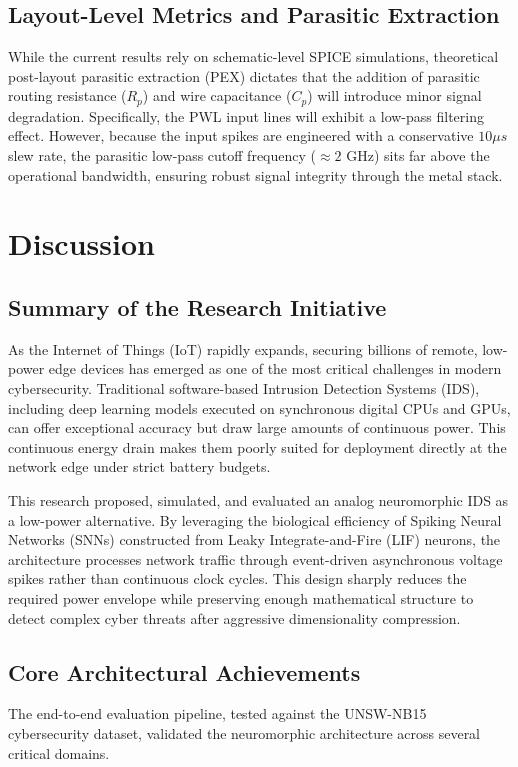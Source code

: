 \documentclass{ieeeaccess}
\begin{document}
\subsection{Layout-Level Metrics and Parasitic Extraction}
While the current results rely on schematic-level SPICE simulations, theoretical post-layout parasitic extraction (PEX) dictates that the addition of parasitic routing resistance ($R_p$) and wire capacitance ($C_p$) will introduce minor signal degradation. Specifically, the PWL input lines will exhibit a low-pass filtering effect. However, because the input spikes are engineered with a conservative $10 \mu s$ slew rate, the parasitic low-pass cutoff frequency ($\approx 2$ GHz) sits far above the operational bandwidth, ensuring robust signal integrity through the metal stack.

\section{Discussion}

\subsection{Summary of the Research Initiative}
As the Internet of Things (IoT) rapidly expands, securing billions of remote, low-power edge devices has emerged as one of the most critical challenges in modern cybersecurity. Traditional software-based Intrusion Detection Systems (IDS), including deep learning models executed on synchronous digital CPUs and GPUs, can offer exceptional accuracy but draw large amounts of continuous power. This continuous energy drain makes them poorly suited for deployment directly at the network edge under strict battery budgets.

This research proposed, simulated, and evaluated an analog neuromorphic IDS as a low-power alternative. By leveraging the biological efficiency of Spiking Neural Networks (SNNs) constructed from Leaky Integrate-and-Fire (LIF) neurons, the architecture processes network traffic through event-driven asynchronous voltage spikes rather than continuous clock cycles. This design sharply reduces the required power envelope while preserving enough mathematical structure to detect complex cyber threats after aggressive dimensionality compression.

\subsection{Core Architectural Achievements}
The end-to-end evaluation pipeline, tested against the UNSW-NB15 cybersecurity dataset, validated the neuromorphic architecture across several critical domains.
\end{document}
